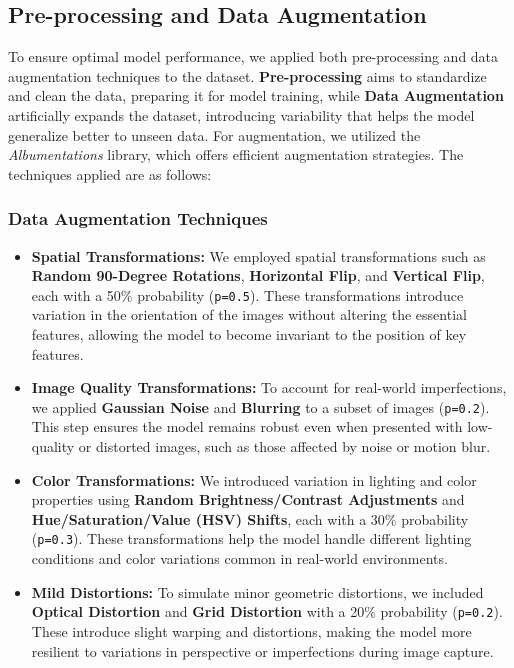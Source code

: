 \documentclass[10pt,twocolumn,letterpaper]{article}
\begin{document}
\subsection{Pre-processing and Data Augmentation}

To ensure optimal model performance, we applied both pre-processing and data augmentation techniques to the dataset. \textbf{Pre-processing} aims to standardize and clean the data, preparing it for model training, while \textbf{Data Augmentation} artificially expands the dataset, introducing variability that helps the model generalize better to unseen data. For augmentation, we utilized the \textit{Albumentations} library, which offers efficient augmentation strategies. The techniques applied are as follows:

\subsubsection{Data Augmentation Techniques}

\begin{itemize}
    \item \textbf{Spatial Transformations:} We employed spatial transformations such as \textbf{Random 90-Degree Rotations}, \textbf{Horizontal Flip}, and \textbf{Vertical Flip}, each with a 50\% probability (\texttt{p=0.5}). These transformations introduce variation in the orientation of the images without altering the essential features, allowing the model to become invariant to the position of key features.
    
    \item \textbf{Image Quality Transformations:} To account for real-world imperfections, we applied \textbf{Gaussian Noise} and \textbf{Blurring} to a subset of images (\texttt{p=0.2}). This step ensures the model remains robust even when presented with low-quality or distorted images, such as those affected by noise or motion blur.
    
    \item \textbf{Color Transformations:} We introduced variation in lighting and color properties using \textbf{Random Brightness/Contrast Adjustments} and \textbf{Hue/Saturation/Value (HSV) Shifts}, each with a 30\% probability (\texttt{p=0.3}). These transformations help the model handle different lighting conditions and color variations common in real-world environments.
    
    \item \textbf{Mild Distortions:} To simulate minor geometric distortions, we included \textbf{Optical Distortion} and \textbf{Grid Distortion} with a 20\% probability (\texttt{p=0.2}). These introduce slight warping and distortions, making the model more resilient to variations in perspective or imperfections during image capture.
\end{itemize}
\end{document}
